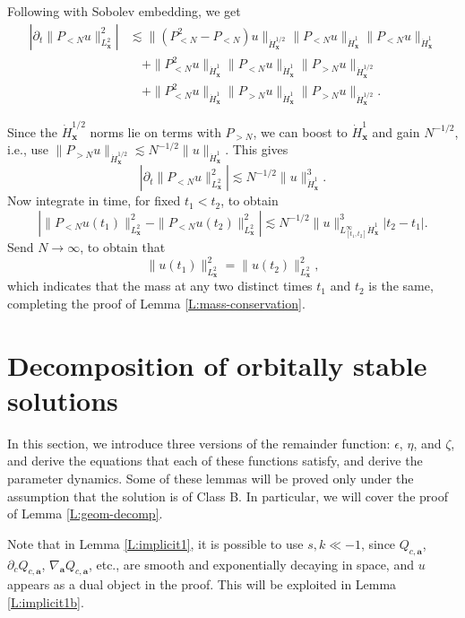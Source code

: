 \documentclass[12pt,letterpaper]{amsart}
\theoremstyle{remark}
\numberwithin{equation}{section}
\numberwithin{theorem}{section}
\numberwithin{table}{section}
\begin{document}
Following with Sobolev embedding, we get 
\begin{align*}
\left| \partial_t \| P_{<N} u\|_{L_{\mathbf{x}}^2}^2 \right| &\lesssim \| (P_{<N}^2-P_{<N}) u \|_{\dot H_\mathbf{x}^{1/2}} \|P_{<N} u\|_{\dot H_\mathbf{x}^1}  \| P_{<N}u\|_{\dot H_\mathbf{x}^1} \\
&\quad + \| P_{<N}^2 u \|_{\dot H_\mathbf{x}^1} \| P_{<N} u \|_{\dot H_\mathbf{x}^1} \| P_{>N} u\|_{\dot H_\mathbf{x}^{1/2}} \\
&\quad + \| P_{<N}^2 u \|_{\dot H_\mathbf{x}^1} \| P_{>N} u \|_{\dot H_\mathbf{x}^1} \| P_{>N} u\|_{\dot H_\mathbf{x}^{1/2}}.
\end{align*}

Since the $\dot H_\mathbf{x}^{1/2}$ norms lie on terms with $P_{>N}$, we can boost to $\dot H_\mathbf{x}^1$ and gain $N^{-1/2}$, i.e., use $\| P_{>N} u \|_{\dot H_\mathbf{x}^{1/2}} \lesssim N^{-1/2} \| u \|_{\dot H_\mathbf{x}^1}$. This gives
$$
\left| \partial_t \| P_{<N} u\|_{L_{\mathbf{x}}^2}^2 \right|   \lesssim N^{-1/2} \| u \|_{\dot H_{\mathbf{x}}^1}^3.
$$
Now integrate in time, for fixed $t_1<t_2$, to obtain
$$
\left| \|P_{<N} u(t_1) \|_{L_{\mathbf{x}}^2}^2 - \|P_{<N} u(t_2) \|_{L_{\mathbf{x}}^2}^2 \right| \lesssim N^{-1/2} \| u \|_{L_{[t_1,t_2]}^\infty \dot H_{\mathbf{x}}^1}^3 |t_2-t_1|.
$$
Send $N\to \infty$, to obtain that 
$$
\|u(t_1) \|_{L_{\mathbf{x}}^2}^2 = \|u(t_2) \|_{L_{\mathbf{x}}^2}^2,
$$
which indicates that the mass at any two distinct times $t_1$ and $t_2$ is the same, completing the proof of Lemma \ref{L:mass-conservation}.

\section{Decomposition of orbitally stable solutions}
\label{S:geom-decomp}

In this section, we introduce three versions of the remainder function: $\epsilon$, $\eta$, and $\zeta$, and derive the equations that each of these functions satisfy, and derive the parameter dynamics.  Some of these lemmas will be proved only under the assumption that the solution is of Class B.  In particular, we will cover the proof of Lemma \ref{L:geom-decomp}.  

Note that in Lemma \ref{L:implicit1}, it is possible to use  $s,k \ll -1$, since $Q_{c,\mathbf{a}}$, $\partial_c Q_{c,\mathbf{a}}$, $\nabla_{\mathbf{a}} Q_{c,\mathbf{a}}$, etc., are smooth and exponentially decaying in space, and $u$ appears as a dual object in the proof.   This will be exploited in Lemma \ref{L:implicit1b}.
\end{document}
